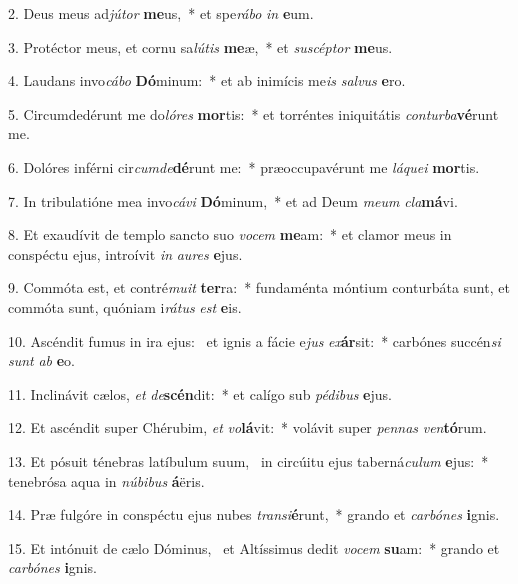 2. Deus meus ad\textit{jú}\textit{tor} \textbf{me}us,~*  et spe\textit{rá}\textit{bo} \textit{in} \textbf{e}um.\

3. Protéctor meus, et cornu sa\textit{lú}\textit{tis} \textbf{me}æ,~*  et \textit{su}\textit{scép}\textit{tor} \textbf{me}us.\

4. Laudans invo\textit{cá}\textit{bo} \textbf{Dó}minum:~*  et ab inimícis me\textit{is} \textit{sal}\textit{vus} \textbf{e}ro.\

5. Circumdedérunt me do\textit{ló}\textit{res} \textbf{mor}tis:~*  et torréntes iniquitátis \textit{con}\textit{tur}\textit{ba}\textbf{vé}runt me.\

6. Dolóres inférni cir\textit{cum}\textit{de}\textbf{dé}runt me:~*  præoccupavérunt me \textit{lá}\textit{que}\textit{i} \textbf{mor}tis.\

7. In tribulatióne mea invo\textit{cá}\textit{vi} \textbf{Dó}minum,~*  et ad Deum \textit{me}\textit{um} \textit{cla}\textbf{má}vi.\

8. Et exaudívit de templo sancto suo \textit{vo}\textit{cem} \textbf{me}am:~*  et clamor meus in conspéctu ejus, introívit \textit{in} \textit{au}\textit{res} \textbf{e}jus.\

9. Commóta est, et contré\textit{mu}\textit{it} \textbf{ter}ra:~*  fundaménta móntium conturbáta sunt, et commóta sunt, quóniam i\textit{rá}\textit{tus} \textit{est} \textbf{e}is.\

10. Ascéndit fumus in ira ejus: \dag\  et ignis a fácie e\textit{jus} \textit{ex}\textbf{ár}sit:~*  carbónes succén\textit{si} \textit{sunt} \textit{ab} \textbf{e}o.\

11. Inclinávit cælos, \textit{et} \textit{de}\textbf{scén}dit:~*  et calígo sub \textit{pé}\textit{di}\textit{bus} \textbf{e}jus.\

12. Et ascéndit super Chérubim, \textit{et} \textit{vo}\textbf{lá}vit:~*  volávit super \textit{pen}\textit{nas} \textit{ven}\textbf{tó}rum.\

13. Et pósuit ténebras latíbulum suum, \dag\  in circúitu ejus taberná\textit{cu}\textit{lum} \textbf{e}jus:~*  tenebrósa aqua in \textit{nú}\textit{bi}\textit{bus} \textbf{á}ëris.\

14. Præ fulgóre in conspéctu ejus nubes \textit{trans}\textit{i}\textbf{é}runt,~*  grando et \textit{car}\textit{bó}\textit{nes} \textbf{i}gnis.\

15. Et intónuit de cælo Dóminus, \dag\  et Altíssimus dedit \textit{vo}\textit{cem} \textbf{su}am:~*  grando et \textit{car}\textit{bó}\textit{nes} \textbf{i}gnis.\

